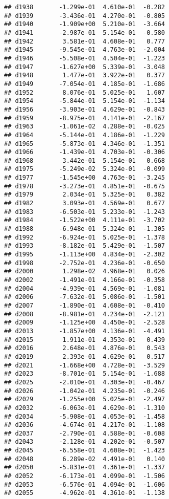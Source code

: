 \documentclass[
]{article}
\begin{document}
\begin{verbatim}
## d1938       -1.299e-01  4.610e-01  -0.282
## d1939       -3.436e-01  4.270e-01  -0.805
## d1940       -1.909e+00  5.210e-01  -3.664
## d1941       -2.987e-01  5.154e-01  -0.580
## d1942        3.581e-01  4.608e-01   0.777
## d1945       -9.545e-01  4.763e-01  -2.004
## d1946       -5.508e-01  4.504e-01  -1.223
## d1947       -1.627e+00  5.339e-01  -3.048
## d1948        1.477e-01  3.922e-01   0.377
## d1949       -7.054e-01  4.185e-01  -1.686
## d1952        8.076e-01  5.025e-01   1.607
## d1954       -5.844e-01  5.154e-01  -1.134
## d1956       -3.903e-01  4.629e-01  -0.843
## d1959       -8.975e-01  4.141e-01  -2.167
## d1963       -1.061e-02  4.288e-01  -0.025
## d1964       -5.144e-01  4.186e-01  -1.229
## d1965       -5.873e-01  4.346e-01  -1.351
## d1966       -1.439e-01  4.703e-01  -0.306
## d1968        3.442e-01  5.154e-01   0.668
## d1975       -5.249e-02  5.324e-01  -0.099
## d1977       -1.545e+00  4.763e-01  -3.245
## d1978       -3.273e-01  4.851e-01  -0.675
## d1979        2.034e-01  5.325e-01   0.382
## d1982        3.093e-01  4.569e-01   0.677
## d1983       -6.503e-01  5.233e-01  -1.243
## d1984       -1.522e+00  4.111e-01  -3.702
## d1988       -6.948e-01  5.324e-01  -1.305
## d1992       -6.924e-01  5.025e-01  -1.378
## d1993       -8.182e-01  5.429e-01  -1.507
## d1995       -1.113e+00  4.834e-01  -2.302
## d1998       -2.752e-01  4.236e-01  -0.650
## d2000        1.298e-02  4.968e-01   0.026
## d2002       -1.491e-01  4.166e-01  -0.358
## d2004       -4.939e-01  4.569e-01  -1.081
## d2006       -7.632e-01  5.086e-01  -1.501
## d2007       -1.890e-01  4.608e-01  -0.410
## d2008       -8.981e-01  4.234e-01  -2.121
## d2009       -1.125e+00  4.450e-01  -2.528
## d2013       -1.857e+00  4.136e-01  -4.491
## d2015        1.911e-01  4.353e-01   0.439
## d2016        2.648e-01  4.876e-01   0.543
## d2019        2.393e-01  4.629e-01   0.517
## d2021       -1.668e+00  4.728e-01  -3.529
## d2023       -8.701e-01  5.154e-01  -1.688
## d2025       -2.010e-01  4.303e-01  -0.467
## d2026       -1.042e-01  4.235e-01  -0.246
## d2029       -1.255e+00  5.025e-01  -2.497
## d2032       -6.063e-01  4.629e-01  -1.310
## d2034       -5.908e-01  4.053e-01  -1.458
## d2036       -4.674e-01  4.217e-01  -1.108
## d2037       -2.790e-01  4.588e-01  -0.608
## d2043       -2.128e-01  4.202e-01  -0.507
## d2045       -6.558e-01  4.608e-01  -1.423
## d2048        6.289e-02  4.491e-01   0.140
## d2050       -5.831e-01  4.361e-01  -1.337
## d2052       -6.173e-01  4.099e-01  -1.506
## d2053       -6.576e-01  4.094e-01  -1.606
## d2055       -4.962e-01  4.361e-01  -1.138

\end{verbatim}
\end{document}
